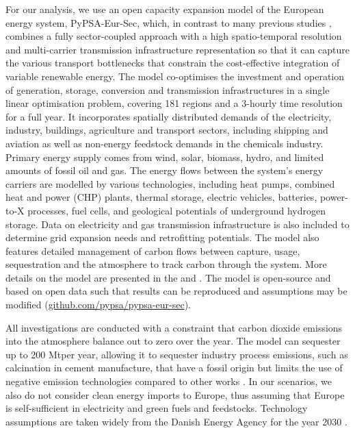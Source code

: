 For our analysis, we use an open capacity expansion model of the European energy
system, PyPSA-Eur-Sec, which, in contrast to many previous studies
\cite{henningComprehensiveModel2014,mathiesenSmartEnergy2015,connollySmartEnergy2016,lofflerDesigningModel2017,blancoPotentialHydrogen2018,brownSynergiesSector2018,in-depth_2018,victoria2020},
combines a fully sector-coupled approach with a high spatio-temporal resolution
and multi-carrier transmission infrastructure representation so that it can
capture the various transport bottlenecks that constrain the cost-effective
integration of variable renewable energy. The model co-optimises the investment
and operation of generation, storage, conversion and transmission
infrastructures in a single linear optimisation problem, covering 181 regions
and a 3-hourly time resolution for a full year. It incorporates spatially
distributed demands of the electricity, industry, buildings, agriculture and
transport sectors, including shipping and aviation as well as non-energy
feedstock demands in the chemicals industry. Primary energy supply comes from
wind, solar, biomass, hydro, and limited amounts of fossil oil and gas. The
energy flows between the system's energy carriers are modelled by various
technologies, including heat pumps, combined heat and power (CHP) plants,
thermal storage, electric vehicles, batteries, power-to-X processes, fuel cells,
and geological potentials of underground hydrogen storage. Data on electricity
and gas transmission infrastructure is also included to determine grid expansion
needs and retrofitting potentials. The model also features detailed management
of carbon flows between capture, usage, sequestration and the atmosphere to
track carbon through the system. More details on the model are presented in the
 and . The model is open-source and based
on open data such that results can be reproduced and assumptions may be modified
(\href{https://github.com/pypsa/pypsa-eur-sec}{github.com/pypsa/pypsa-eur-sec}).

All investigations are conducted with a constraint that carbon dioxide emissions
into the atmosphere balance out to zero over the year. The model can sequester
up to 200 Mt\co per year, allowing it to sequester industry process emissions,
such as calcination in cement manufacture, that have a fossil origin but limits
the use of negative emission technologies compared to other works
\cite{blancoPotentialHydrogen2018}. In our scenarios, we also do not consider
clean energy imports to Europe, thus assuming that Europe is self-sufficient in
electricity and green fuels and feedstocks. Technology assumptions are taken
widely from the Danish Energy Agency for the year 2030 \cite{DEA}.

